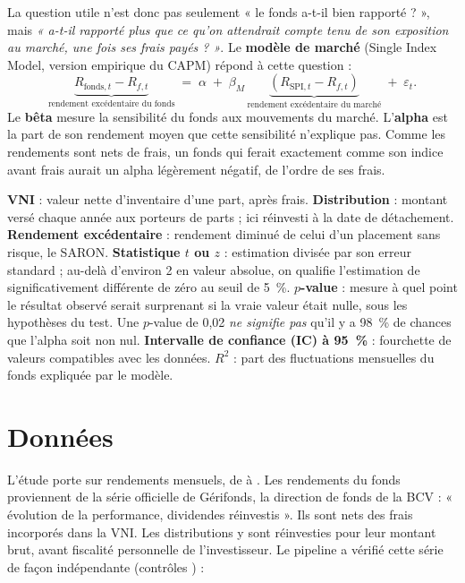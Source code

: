 \documentclass[11pt,a4paper]{article}
\begin{document}
La question utile n'est donc pas seulement « le fonds a-t-il bien rapporté ? », mais \emph{« a-t-il rapporté plus que ce qu'on attendrait compte tenu de son exposition au marché, une fois ses frais payés ? »}. Le \textbf{modèle de marché} (Single Index Model, version empirique du CAPM) répond à cette question :
\[
  \underbrace{R_{\text{fonds},t} - R_{f,t}}_{\text{rendement excédentaire du fonds}}
  \;=\; \alpha \;+\; \beta_M \,\underbrace{\left(R_{\text{SPI},t} - R_{f,t}\right)}_{\text{rendement excédentaire du marché}} \;+\; \varepsilon_t .
\]
Le \textbf{bêta} mesure la sensibilité du fonds aux mouvements du marché. L'\textbf{alpha} est la part de son rendement moyen que cette sensibilité n'explique pas. Comme les rendements sont nets de frais, un fonds qui ferait exactement comme son indice avant frais aurait un alpha légèrement négatif, de l'ordre de ses frais.

\begin{lexique}\small
\textbf{VNI} : valeur nette d'inventaire d'une part, après frais. \textbf{Distribution} : montant versé chaque année aux porteurs de parts ; ici réinvesti à la date de détachement. \textbf{Rendement excédentaire} : rendement diminué de celui d'un placement sans risque, le SARON. \textbf{Statistique $t$ ou $z$} : estimation divisée par son erreur standard ; au-delà d'environ 2 en valeur absolue, on qualifie l'estimation de significativement différente de zéro au seuil de 5~\%. \textbf{$p$-value} : mesure à quel point le résultat observé serait surprenant si la vraie valeur était nulle, sous les hypothèses du test. Une $p$-value de 0,02 \emph{ne signifie pas} qu'il y a 98~\% de chances que l'alpha soit non nul. \textbf{Intervalle de confiance (IC) à 95~\%} : fourchette de valeurs compatibles avec les données. \textbf{$R^2$} : part des fluctuations mensuelles du fonds expliquée par le modèle.
\end{lexique}

\section{Données}

L'étude porte sur \NObs{} rendements mensuels, de \PeriodeDebut{} à \PeriodeFin{}\Contigu. Les rendements du fonds proviennent de la série officielle de Gérifonds, la direction de fonds de la BCV : « évolution de la performance, dividendes réinvestis ». Ils sont nets des frais incorporés dans la VNI. Les distributions y sont réinvesties pour leur montant brut, avant fiscalité personnelle de l'investisseur. Le pipeline a vérifié cette série de façon indépendante (contrôles \FundChecksOK) :
{\small \FundChecks}
\end{document}
